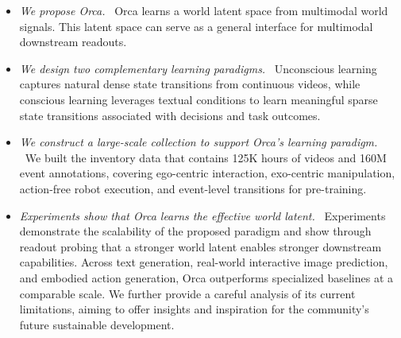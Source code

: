 \vspace{-0.5em}
\begin{itemize}
    \item \textit{We propose Orca.} \ Orca learns a world latent space from multimodal world signals. This latent space can serve as a general interface for multimodal downstream readouts.

    \item \textit{We design two complementary learning paradigms.} \ Unconscious learning captures natural dense state transitions from continuous videos, while conscious learning leverages textual conditions to learn meaningful sparse state transitions associated with decisions and task outcomes.
    
    \item \textit{We construct a large-scale collection to support Orca's learning paradigm.} \ We built the inventory data that contains 125K hours of videos and 160M event annotations, covering ego-centric interaction, exo-centric manipulation, action-free robot execution, and event-level transitions for pre-training.
    
    \item \textit{Experiments show that Orca learns the effective world latent.} \ Experiments demonstrate the scalability of the proposed paradigm and show through readout probing that a stronger world latent enables stronger downstream capabilities. Across text generation, real-world interactive image prediction, and embodied action generation, Orca outperforms specialized baselines at a comparable scale. We further provide a careful analysis of its current limitations, aiming to offer insights and inspiration for the community's future sustainable development.
\end{itemize}
